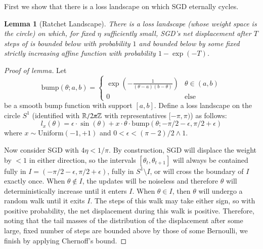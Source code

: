 \documentclass[openany, notitlepage, justified]{tufte-book}
\theoremstyle{plain}
\newtheorem{lem}{Lemma}
\theoremstyle{definition}
\newcommand{\wrap}[1]{\left(#1\right)}
\begin{document}
        First we show that there is a loss landscape on which SGD eternally
        cycles.  
        \begin{lem}[Ratchet Landscape]
            There is a loss landscape (whose weight space is the circle) on
            which, for fixed $\eta$ sufficiently small, SGD's net displacement
            after $T$ steps of is bounded below with probability $1$ and
            bounded below by some fixed strictly increasing affine function
            with probability $1-\exp(-T)$. 
        \end{lem}
        \begin{proof}[Proof of lemma]
            Let
            $$
                \text{bump}(\theta;a,b) = \begin{cases}
                    \exp\wrap{-\frac{1}{(\theta-a)(b-\theta)}}  &   \theta\in(a,b) \\
                    0                                           &   \text{else}
                \end{cases}
            $$
            be a smooth bump function with support $[a,b]$.
            Define a loss landscape on the circle $S^1$
            (identified with $\mathbb{R}/2\pi \mathbb{Z}$ with representatives $[-\pi, \pi)$)
            as follows: 
            $$
                l_x(\theta) = \epsilon \cdot \sin(\theta) +
                              x \cdot \theta \cdot \text{bump}(\theta;-\pi/2-\epsilon,\pi/2+\epsilon)
            $$
            where $x\sim \text{Uniform}(-1, +1)$ and
            $0<\epsilon<(\pi-2)/2\wedge 1$.

            Now consider SGD with $4\eta<1/\pi$.
            By construction, SGD will displace
            the weight by $<1$ in either direction, so the intervals
            $[\theta_t, \theta_{t+1}]$ will always be contained fully in $I =
            (-\pi/2-\epsilon,\pi/2+\epsilon)$, fully in $S^1\setminus I$, or
            will cross the boundary of $I$ exactly once.
            When $\theta\notin I$, the updates will be noiseless and therefore
            $\theta$ will deterministically increase until it enters $I$.
            When $\theta\in I$, then $\theta$ will undergo a random walk until it
            exits $I$.  The steps of this walk may take either sign, so with
            positive probability, the net displacement during this walk is
            positive.
            Therefore, noting that the tail masses of the distribution of the
            displacement after some large, fixed number of steps are bounded
            above by those of some Bernoulli, we finish by applying Chernoff's
            bound.
        \end{proof}
\end{document}

